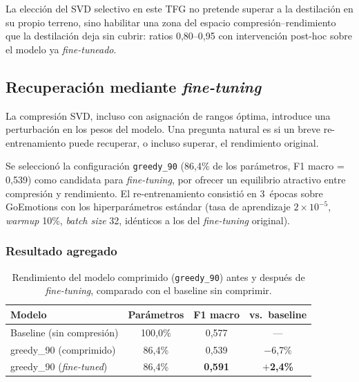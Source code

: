 La elección del SVD selectivo en este TFG no pretende superar a la
destilación en su propio terreno, sino habilitar una zona del espacio
compresión--rendimiento que la destilación deja sin cubrir: ratios
0{,}80--0{,}95 con intervención post-hoc sobre el modelo
ya \emph{fine-tuneado}.


\subsection{Recuperación mediante \emph{fine-tuning}}
\label{sec:finetuning-recovery}

La compresión SVD, incluso con asignación de rangos óptima, introduce una
perturbación en los pesos del modelo. Una pregunta natural es si un breve
re-entrenamiento puede recuperar, o incluso superar, el rendimiento
original.

Se seleccionó la configuración \texttt{greedy\_90} (86{,}4\% de los
parámetros, F1 macro = 0{,}539) como candidata para \emph{fine-tuning}, por
ofrecer un equilibrio atractivo entre compresión y rendimiento. El
re-entrenamiento consistió en 3~épocas sobre GoEmotions con los
hiperparámetros estándar (tasa de aprendizaje $2 \times 10^{-5}$,
\textit{warmup} 10\%, \textit{batch size} 32, idénticos a los del
\emph{fine-tuning} original).

\subsubsection{Resultado agregado}

\begin{table}[ht]
\centering
\caption{Rendimiento del modelo comprimido (\texttt{greedy\_90}) antes y
después de \emph{fine-tuning}, comparado con el baseline sin comprimir.}
\label{tab:finetuning-summary}
\small
\begin{tabular}{lccc}
\toprule
\textbf{Modelo} & \textbf{Parámetros} & \textbf{F1 macro} & \textbf{vs.\ baseline} \\
\midrule
Baseline (sin compresión) & 100{,}0\% & 0{,}577 & --- \\
greedy\_90 (comprimido)   & 86{,}4\%  & 0{,}539 & $-$6{,}7\% \\
greedy\_90 (\emph{fine-tuned})   & 86{,}4\%  & \textbf{0{,}591} & \textbf{$+$2{,}4\%} \\
\bottomrule
\end{tabular}
\end{table}

